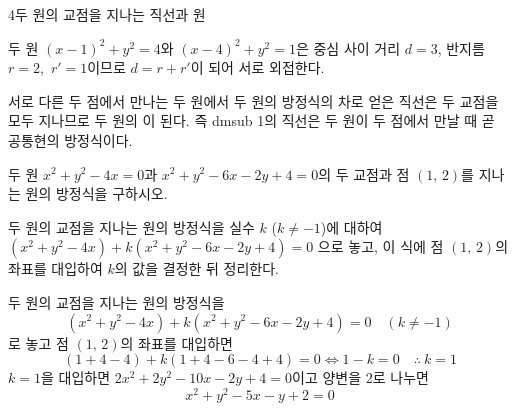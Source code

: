 \documentclass[10pt]{article}
\begin{document}
\begin{dmconcept}{4}{두 원의 교점을 지나는 직선과 원}
\begin{dmexample}
두 원 $(x - 1)^2 + y^2 = 4$와 $(x - 4)^2 + y^2 = 1$은 중심 사이 거리 $d = 3$, 반지름 $r = 2$,\ $r' = 1$이므로 $d = r + r'$이 되어 서로 외접한다.
\end{dmexample}

\begin{dmnote}
서로 다른 두 점에서 만나는 두 원에서 두 원의 방정식의 차로 얻은 직선은 두 교점을 모두 지나므로 두 원의 이 된다. 즉 dmsub 1의 직선은 두 원이 두 점에서 만날 때 곧 공통현의 방정식이다.
\end{dmnote}

\vspace{27.1mm}%
\end{dmconcept}

\newpage


\begin{dmproblem}
두 원 $x^2 + y^2 - 4x = 0$과 $x^2 + y^2 - 6x - 2y + 4 = 0$의 두 교점과 점 $(1,\, 2)$를 지나는 원의 방정식을 구하시오.
\end{dmproblem}

\begin{dmapproach}
두 원의 교점을 지나는 원의 방정식을 실수 $k$ ($k \ne -1$)에 대하여
$(x^2 + y^2 - 4x) + k(x^2 + y^2 - 6x - 2y + 4) = 0$
으로 놓고, 이 식에 점 $(1,\, 2)$의 좌표를 대입하여 $k$의 값을 결정한 뒤 정리한다.
\end{dmapproach}

\begin{dmsolution}
두 원의 교점을 지나는 원의 방정식을
\begin{equation*}
  (x^2 + y^2 - 4x) + k(x^2 + y^2 - 6x - 2y + 4) = 0 \quad (k \ne -1)
\end{equation*}
로 놓고 점 $(1,\, 2)$의 좌표를 대입하면
\begin{equation*}
  (1 + 4 - 4) + k(1 + 4 - 6 - 4 + 4) = 0 \iff 1 - k = 0 \quad \therefore\ k = 1
\end{equation*}
$k = 1$을 대입하면 $2x^2 + 2y^2 - 10x - 2y + 4 = 0$이고 양변을 $2$로 나누면
\begin{equation*}
  x^2 + y^2 - 5x - y + 2 = 0
\end{equation*}
\end{dmsolution}
\end{document}
